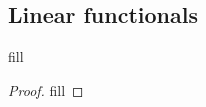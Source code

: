 \subsection{Linear functionals}

\begin{exercise}{1}
fill
\end{exercise}
\begin{proof}
fill
\end{proof}
